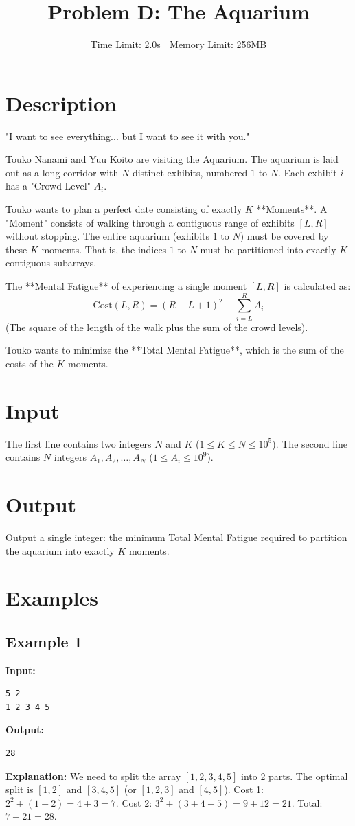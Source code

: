 \documentclass[11pt, letterpaper]{article}
\title{\textbf{Problem D: The Aquarium}}
\author{Time Limit: 2.0s | Memory Limit: 256MB}
\date{}
\begin{document}
\maketitle

\section*{Description}

"I want to see everything... but I want to see it with you."

Touko Nanami and Yuu Koito are visiting the Aquarium. The aquarium is laid out as a long corridor with $N$ distinct exhibits, numbered $1$ to $N$. Each exhibit $i$ has a "Crowd Level" $A_i$.

Touko wants to plan a perfect date consisting of exactly $K$ **Moments**.
A "Moment" consists of walking through a contiguous range of exhibits $[L, R]$ without stopping.
The entire aquarium (exhibits $1$ to $N$) must be covered by these $K$ moments. That is, the indices $1$ to $N$ must be partitioned into exactly $K$ contiguous subarrays.

The **Mental Fatigue** of experiencing a single moment $[L, R]$ is calculated as:
$$ \text{Cost}(L, R) = (R - L + 1)^2 + \sum_{i=L}^{R} A_i $$
(The square of the length of the walk plus the sum of the crowd levels).

Touko wants to minimize the **Total Mental Fatigue**, which is the sum of the costs of the $K$ moments.

\section*{Input}

The first line contains two integers $N$ and $K$ ($1 \le K \le N \le 10^5$).
The second line contains $N$ integers $A_1, A_2, \dots, A_N$ ($1 \le A_i \le 10^9$).

\section*{Output}

Output a single integer: the minimum Total Mental Fatigue required to partition the aquarium into exactly $K$ moments.

\section*{Examples}

\subsection*{Example 1}
\textbf{Input:}
\begin{verbatim}
5 2
1 2 3 4 5
\end{verbatim}

\textbf{Output:}
\begin{verbatim}
28
\end{verbatim}

\textbf{Explanation:}
We need to split the array $[1, 2, 3, 4, 5]$ into 2 parts.
The optimal split is $[1, 2]$ and $[3, 4, 5]$ (or $[1, 2, 3]$ and $[4, 5]$).
Cost 1: $2^2 + (1+2) = 4 + 3 = 7$.
Cost 2: $3^2 + (3+4+5) = 9 + 12 = 21$.
Total: $7 + 21 = 28$.
\end{document}
